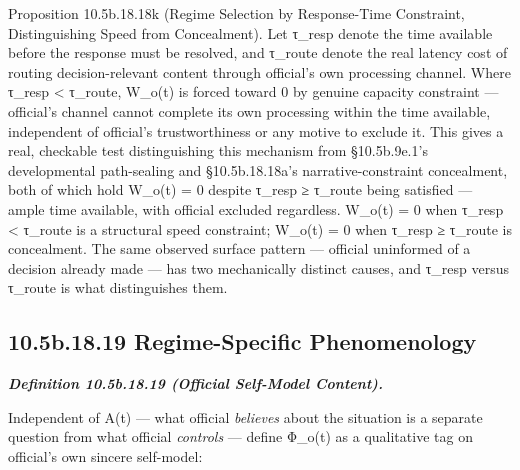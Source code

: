 \documentclass[
]{article}
\begin{document}
Proposition 10.5b.18.18k (Regime Selection by Response-Time Constraint,
Distinguishing Speed from Concealment). Let τ\_resp denote the time
available before the response must be resolved, and τ\_route denote the
real latency cost of routing decision-relevant content through
official's own processing channel. Where τ\_resp \textless{} τ\_route,
W\_o(t) is forced toward 0 by genuine capacity constraint --- official's
channel cannot complete its own processing within the time available,
independent of official's trustworthiness or any motive to exclude it.
This gives a real, checkable test distinguishing this mechanism from
§10.5b.9e.1's developmental path-sealing and §10.5b.18.18a's
narrative-constraint concealment, both of which hold W\_o(t) = 0 despite
τ\_resp ≥ τ\_route being satisfied --- ample time available, with
official excluded regardless. W\_o(t) = 0 when τ\_resp \textless{}
τ\_route is a structural speed constraint; W\_o(t) = 0 when τ\_resp ≥
τ\_route is concealment. The same observed surface pattern --- official
uninformed of a decision already made --- has two mechanically distinct
causes, and τ\_resp versus τ\_route is what distinguishes them.

\hypertarget{b.18.19-regime-specific-phenomenology}{%
\subsection{10.5b.18.19 Regime-Specific
Phenomenology}\label{b.18.19-regime-specific-phenomenology}}

\emph{\textbf{Definition 10.5b.18.19 (Official Self-Model Content).}}

Independent of A(t) --- what official \emph{believes} about the
situation is a separate question from what official \emph{controls} ---
define Φ\_o(t) as a qualitative tag on official's own sincere
self-model:
\end{document}
